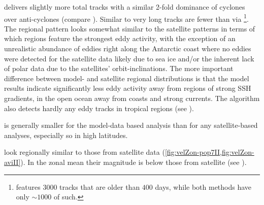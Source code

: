 \renewcommand{\run}[1]{#1-pop7II}
\renewcommand{\RUN}{pop7-\MII: }

 delivers slightly more total tracks with a similar 2-fold dominance of cyclones over anti-cyclones (compare ). Similar to \aviII very long tracks are fewer than via \aviI \footnote{\aviI features $3000$ tracks that are older than $400$ days, while both \MII methods have only $\sim1000$ of such.}. The regional pattern looks somewhat similar to the satellite patterns in terms of which regions feature the strongest eddy activity, with the exception of an unrealistic abundance of eddies right along the Antarctic coast  where no eddies were detected for the satellite data likely due to sea ice and/or the inherent lack of polar data due to the satellites' orbit-inclinations.
The more important difference between model- and satellite regional distributions is that the model results indicate significantly less eddy activity away from regions of strong SSH gradients, in the open ocean away from coasts and strong currents. The algorithm also detects hardly any eddy tracks in tropical regions (see ).

 is generally smaller for the model-data based analysis than for any satellite-based analyses, especially so in high latitudes.

 look regionally similar to those from satellite data (\cref{fig:velZon-pop7II,fig:velZon-aviII}). In the zonal mean their magnitude is below those from satellite (see ).

